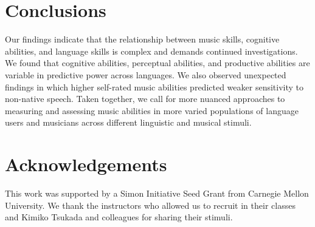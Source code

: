 \documentclass[a4paper]{article}
\begin{document}
\section{Conclusions}

Our findings indicate that the relationship between music skills, cognitive abilities, and language skills is complex and demands continued investigations. We found that cognitive abilities, perceptual abilities, and productive abilities are variable in predictive power across languages. We also observed unexpected findings in which higher self-rated music abilities predicted weaker sensitivity to non-native speech. Taken together, we call for more nuanced approaches to measuring and assessing music abilities in more varied populations of language users and musicians across different linguistic and musical stimuli.

\section{Acknowledgements}

This work was supported by a Simon Initiative Seed Grant from Carnegie Mellon University. We thank the instructors who allowed us to recruit in their classes and Kimiko Tsukada and colleagues for sharing their stimuli.



\end{document}
